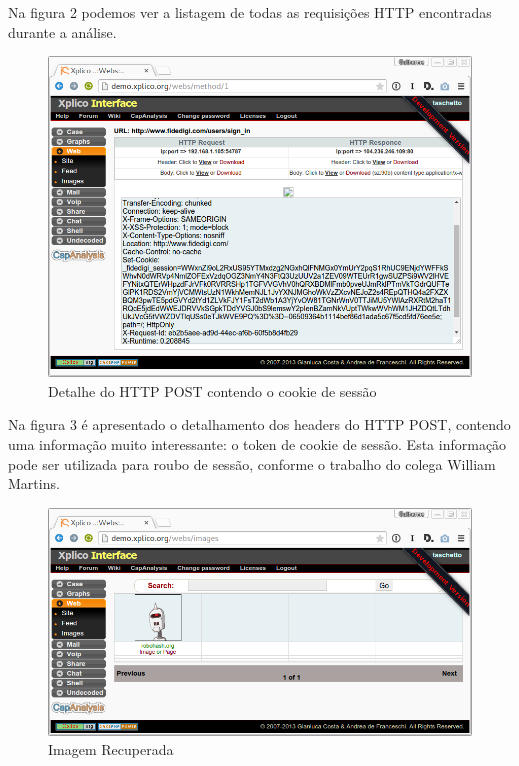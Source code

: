 \documentclass[12pt]{article}
\begin{document}
Na figura 2 podemos ver a listagem de todas as requisições HTTP encontradas durante a análise.

\begin{figure}[ht]
    \centering
    \includegraphics[scale=0.4]{img/3.png}
    \caption{Detalhe do HTTP POST contendo o cookie de sessão}
    \label{fig:cookie}
\end{figure}

Na figura 3 é apresentado o detalhamento dos headers do HTTP POST, contendo uma informação muito interessante: o token de cookie de sessão. Esta informação pode ser utilizada para roubo de sessão, conforme o trabalho do colega William Martins.

\begin{figure}[ht]
    \centering
    \includegraphics[scale=0.4]{img/4.png}
    \caption{Imagem Recuperada}
    \label{fig:imagem}
\end{figure}
\end{document}
